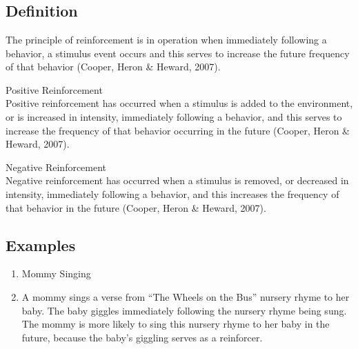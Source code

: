 \section{\fourdOne{}}
\subsection{Definition}
The principle of reinforcement is in operation when immediately following a behavior, a stimulus event occurs and this serves to increase the future frequency of that behavior (Cooper, Heron \& Heward, 2007).

Positive Reinforcement\\
Positive reinforcement has occurred when a stimulus is added to the environment, or is increased in intensity, immediately following a behavior, and this serves to increase the frequency of that behavior occurring in the future (Cooper, Heron \& Heward, 2007).

Negative Reinforcement\\
Negative reinforcement has occurred when a stimulus is removed, or decreased in intensity, immediately following a behavior, and this increases the frequency of that behavior in the future (Cooper, Heron \& Heward, 2007).
\subsection{Examples}
\begin{enumerate}
\item Mommy Singing
\item A mommy sings a verse from ``The Wheels on the Bus'' nursery rhyme to her baby. The baby giggles immediately following the nursery rhyme being sung. The mommy is more likely to sing this nursery rhyme to her baby in the future, because the baby's giggling serves as a reinforcer.
\end{enumerate}
 

